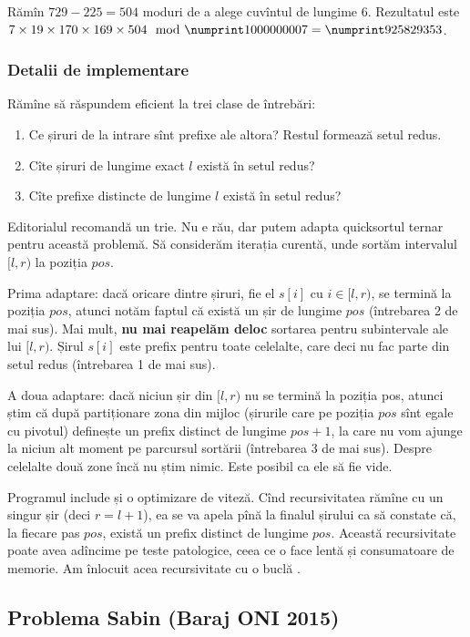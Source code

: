 \documentclass[../main.tex]{subfiles}
\begin{document}
Rămîn $729 - 225 = 504$ moduri de a alege cuvîntul de lungime 6. Rezultatul este $7 \times 19 \times 170 \times 169 \times 504 \mod \np{1000000007} = \np{925829353}$.

\subsubsection*{Detalii de implementare}

Rămîne să răspundem eficient la trei clase de întrebări:

\begin{enumerate}
  \item Ce șiruri de la intrare sînt prefixe ale altora? Restul formează setul redus.
  \item Cîte șiruri de lungime exact $l$ există în setul redus?
  \item Cîte prefixe distincte de lungime $l$ există în setul redus?
\end{enumerate}

Editorialul recomandă un trie. Nu e rău, dar putem adapta quicksortul ternar pentru această problemă. Să considerăm iterația curentă, unde sortăm intervalul $[l, r)$ la poziția $pos$.

Prima adaptare: dacă oricare dintre șiruri, fie el $s[i]$ cu $i \in [l, r)$, se termină la poziția $pos$, atunci notăm faptul că există un șir de lungime $pos$ (întrebarea 2 de mai sus). Mai mult, \textbf{nu mai reapelăm deloc} sortarea pentru subintervale ale lui $[l, r)$. Șirul $s[i]$ este prefix pentru toate celelalte, care deci nu fac parte din setul redus (întrebarea 1 de mai sus).

A doua adaptare: dacă niciun șir din $[l, r)$ nu se termină la poziția pos, atunci știm că după partiționare zona din mijloc (șirurile care pe poziția $pos$ sînt egale cu pivotul) definește un prefix distinct de lungime $pos + 1$, la care nu vom ajunge la niciun alt moment pe parcursul sortării (întrebarea 3 de mai sus). Despre celelalte două zone încă nu știm nimic. Este posibil ca ele să fie vide.

Programul include și o optimizare de viteză. Cînd recursivitatea rămîne cu un singur șir (deci $r = l + 1$), ea se va apela pînă la finalul șirului ca să constate că, la fiecare pas $pos$, există un prefix distinct de lungime $pos$. Această recursivitate poate avea adîncime  pe teste patologice, ceea ce o face lentă și consumatoare de memorie. Am înlocuit acea recursivitate cu o buclă .


\subsection{Problema  Sabin (Baraj ONI 2015)}
\label{problem:sabin}
\end{document}
